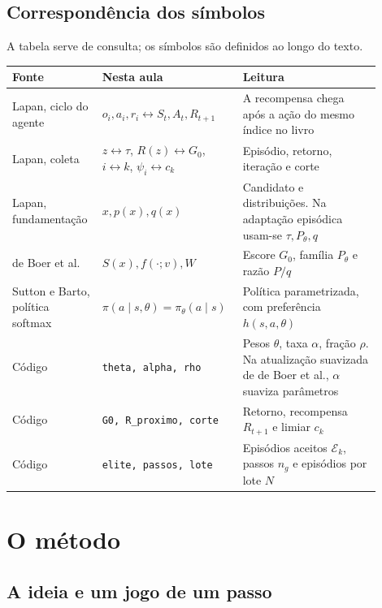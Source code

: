 \documentclass[12pt]{article}
\begin{document}
\subsection{Correspondência dos símbolos}

A tabela serve de consulta; os símbolos são definidos ao longo do texto.

\begin{center}
\small
\begin{tabular}{>{\raggedright\arraybackslash}p{0.22\linewidth}>{\raggedright\arraybackslash}p{0.32\linewidth}>{\raggedright\arraybackslash}p{0.36\linewidth}}
\toprule
Fonte & Nesta aula & Leitura\\
\midrule
Lapan, ciclo do agente & $o_i,a_i,r_i \leftrightarrow S_t,A_t,R_{t+1}$ & A recompensa chega após a ação do mesmo índice no livro\\
Lapan, coleta & $z\leftrightarrow\tau$, $R(z)\leftrightarrow G_0$, $i\leftrightarrow k$, $\psi_i\leftrightarrow c_k$ & Episódio, retorno, iteração e corte\\
Lapan, fundamentação & $x,p(x),q(x)$ & Candidato e distribuições. Na adaptação episódica usam-se $\tau,P_\theta,q$\\
de Boer et al. & $S(x),f(\cdot;v),W$ & Escore $G_0$, família $P_\theta$ e razão $P/q$\\
Sutton e Barto, política softmax & $\pi(a\mid s,\theta)=\pi_\theta(a\mid s)$ & Política parametrizada, com preferência $h(s,a,\theta)$\\
Código & \texttt{theta, alpha, rho} & Pesos $\theta$, taxa $\alpha$, fração $\rho$. Na atualização suavizada de de Boer et al., $\alpha$ suaviza parâmetros\\
Código & \texttt{G0, R\_proximo, corte} & Retorno, recompensa $R_{t+1}$ e limiar $c_k$\\
Código & \texttt{elite, passos, lote} & Episódios aceitos $\mathcal E_k$, passos $n_g$ e episódios por lote $N$\\
\bottomrule
\end{tabular}
\end{center}

\section{O método}

\subsection{A ideia e um jogo de um passo}
\end{document}
